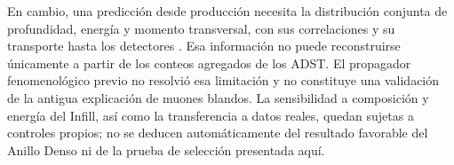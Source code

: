 En cambio, una predicción desde producción necesita la distribución conjunta de profundidad, energía y momento transversal, con sus correlaciones y su transporte hasta los detectores \cite{Cazon2012}. Esa información no puede reconstruirse únicamente a partir de los conteos agregados de los ADST. El propagador fenomenológico previo no resolvió esa limitación y no constituye una validación de la antigua explicación de muones blandos. La sensibilidad a composición y energía del Infill, así como la transferencia a datos reales, quedan sujetas a controles propios; no se deducen automáticamente del resultado favorable del Anillo Denso ni de la prueba de selección presentada aquí.

\newpage
